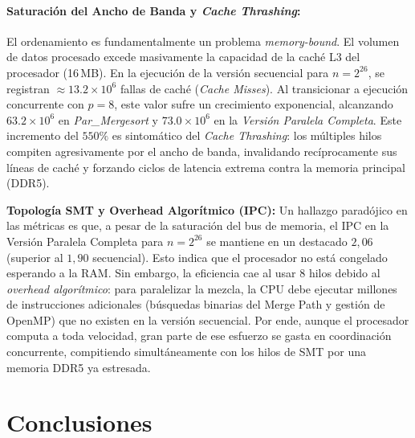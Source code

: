 \documentclass[12pt, a4paper]{article}
\begin{document}
\paragraph{Saturación del Ancho de Banda y \textit{Cache Thrashing}:} El ordenamiento es fundamentalmente un problema \textit{memory-bound}. 
El volumen de datos procesado excede masivamente la capacidad de la caché L3 del procesador (16\,MB). En la ejecución de la versión secuencial para $n=2^{26}$, 
se registran $\approx 13.2 \times 10^6$ fallas de caché (\textit{Cache Misses}). Al transicionar a ejecución concurrente con $p=8$, este valor sufre un crecimiento exponencial, 
alcanzando $63.2 \times 10^6$ en \textit{Par\_Mergesort} y $73.0 \times 10^6$ en la \textit{Versión Paralela Completa}. Este incremento del $550\%$ es sintomático del \textit{Cache Thrashing}: 
los múltiples hilos compiten agresivamente por el ancho de banda, 
invalidando recíprocamente sus líneas de caché y forzando ciclos de latencia extrema contra la memoria principal (DDR5).


\textbf{Topología SMT y Overhead Algorítmico (IPC):} 
Un hallazgo paradójico en las métricas es que, a pesar de la saturación del bus de memoria, 
el IPC en la Versión Paralela Completa para $n = 2^{26}$ se mantiene en un destacado $2,06$ (superior al $1,90$ secuencial). 
Esto indica que el procesador no está congelado esperando a la RAM. 
Sin embargo, la eficiencia cae al usar 8 hilos debido al \textit{overhead algorítmico}: 
para paralelizar la mezcla, la CPU debe ejecutar millones de instrucciones adicionales (búsquedas binarias del Merge Path y gestión de OpenMP) que no existen en la versión secuencial. 
Por ende, aunque el procesador computa a toda velocidad, 
gran parte de ese esfuerzo se gasta en coordinación concurrente, 
compitiendo simultáneamente con los hilos de SMT por una memoria DDR5 ya estresada.

\section{Conclusiones}
\end{document}
